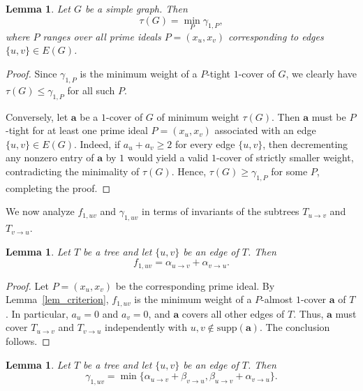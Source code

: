 \documentclass[12pt,amscd]{amsart}
\newtheorem{lem}[thm]{Lemma}
\theoremstyle{definition}
\numberwithin{equation}{section}
\begin{document}
\begin{lem}\label{lem_tau} 
Let $G$ be a simple graph. Then 
\[
\tau(G) = \min_{P} \gamma_{1,P},
\]
where $P$ ranges over all prime ideals $P = (x_u, x_v)$ corresponding to edges $\{u,v\} \in E(G)$.
\end{lem}

\begin{proof}
Since $\gamma_{1,P}$ is the minimum weight of a $P$-tight $1$-cover of $G$, we clearly have $\tau(G) \le \gamma_{1,P}$ for all such $P$. 

Conversely, let $\mathbf{a}$ be a $1$-cover of $G$ of minimum weight $\tau(G)$. Then $\mathbf{a}$ must be $P$-tight for at least one prime ideal $P = (x_u, x_v)$ associated with an edge $\{u,v\} \in E(G)$. Indeed, if $a_u + a_v \ge 2$ for every edge $\{u,v\}$, then decrementing any nonzero entry of $\mathbf{a}$ by $1$ would yield a valid $1$-cover of strictly smaller weight, contradicting the minimality of $\tau(G)$. Hence, $\tau(G) \ge \gamma_{1,P}$ for some $P$, completing the proof.
\end{proof}

We now analyze $f_{1,uv}$ and $\gamma_{1,uv}$ in terms of invariants of the subtrees $T_{u \to v}$ and $T_{v \to u}$.

\begin{lem}\label{lem_4} 
Let $T$ be a tree and let $\{u,v\}$ be an edge of $T$. Then 
\[
f_{1,uv} = \alpha_{u \to v} + \alpha_{v \to u}.
\]
\end{lem}

\begin{proof} 
Let $P = (x_u, x_v)$ be the corresponding prime ideal. By Lemma~\ref{lem_criterion}, $f_{1,uv}$ is the minimum weight of a $P$-almost $1$-cover $\mathbf{a}$ of $T$. In particular, $a_u = 0$ and $a_v = 0$, and $\mathbf{a}$ covers all other edges of $T$. Thus, $\mathbf{a}$ must cover $T_{u \to v}$ and $T_{v \to u}$ independently with $u, v \notin \text{supp}(\mathbf{a})$. The conclusion follows.
\end{proof}

\begin{lem}\label{lem_5} 
Let $T$ be a tree and let $\{u,v\}$ be an edge of $T$. Then 
\[
\gamma_{1,uv} = \min \{\alpha_{u \to v} + \beta_{v \to u}, \beta_{u \to v} + \alpha_{v \to u}\}.
\]
\end{lem}
\end{document}
